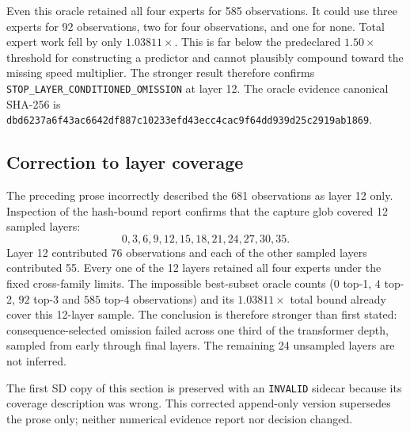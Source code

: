 Even this oracle retained all four experts for 585 observations.  It could use
three experts for 92 observations, two for four observations, and one for
none.  Total expert work fell by only $1.03811\times$.  This is far below the
predeclared $1.50\times$ threshold for constructing a predictor and cannot
plausibly compound toward the missing speed multiplier.  The stronger result
therefore confirms \texttt{STOP\_LAYER\_CONDITIONED\_OMISSION} at layer 12.
The oracle evidence canonical SHA-256 is
\texttt{dbd6237a6f43ac6642df887c10233efd43ecc4cac9f64dd939d25c2919ab1869}.

\subsection{Correction to layer coverage}

The preceding prose incorrectly described the 681 observations as layer 12
only.  Inspection of the hash-bound report confirms that the capture glob
covered 12 sampled layers:
\[
  0,3,6,9,12,15,18,21,24,27,30,35.
\]
Layer 12 contributed 76 observations and each of the other sampled layers
contributed 55.  Every one of the 12 layers retained all four experts under
the fixed cross-family limits.  The impossible best-subset oracle counts
($0$ top-1, $4$ top-2, $92$ top-3 and $585$ top-4 observations) and its
$1.03811\times$ total bound already cover this 12-layer sample.  The conclusion
is therefore stronger than first stated: consequence-selected omission failed
across one third of the transformer depth, sampled from early through final
layers.  The remaining 24 unsampled layers are not inferred.

The first SD copy of this section is preserved with an
\texttt{INVALID} sidecar because its coverage description was wrong.  This
corrected append-only version supersedes the prose only; neither numerical
evidence report nor decision changed.
